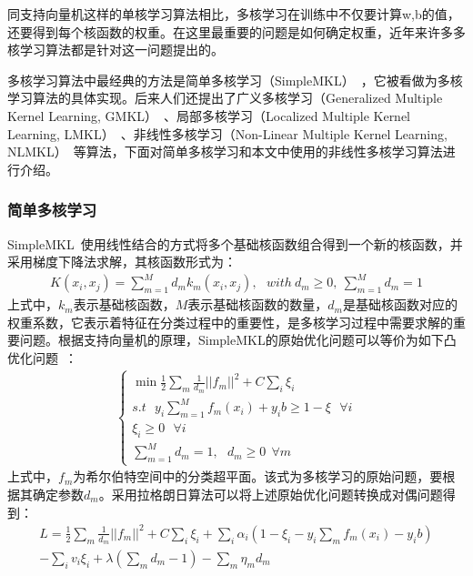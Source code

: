 同支持向量机这样的单核学习算法相比，多核学习在训练中不仅要计算w,b的值，还要得到每个核函数的权重。在这里最重要的问题是如何确定权重，近年来许多多核学习算法都是针对这一问题提出的。

多核学习算法中最经典的方法是简单多核学习（SimpleMKL）~\cite{rakotomamonjy2008simplemkl}，它被看做为多核学习算法的具体实现。后来人们还提出了广义多核学习（Generalized Multiple Kernel Learning, GMKL）~\cite{varma2009more}、局部多核学习（Localized Multiple Kernel Learning, LMKL）~\cite{gonen2008localized}、非线性多核学习（Non-Linear Multiple Kernel Learning, NLMKL）~\cite{cortes2009learning}等算法，下面对简单多核学习和本文中使用的非线性多核学习算法进行介绍。

\subsubsection{简单多核学习}
SimpleMKL~\cite{rakotomamonjy2008simplemkl}使用线性结合的方式将多个基础核函数组合得到一个新的核函数，并采用梯度下降法求解，其核函数形式为：
\begin{eqnarray}
K(x_{i},x_{j})=\sum^{M}_{m=1}d_{m}k_{m}(x_{i},x_{j}), ~~~ with ~ d_{m} \ge 0, ~\sum^{M}_{m=1}d_{m}=1
\end{eqnarray}
上式中，$k_{m}$表示基础核函数，$M$表示基础核函数的数量，$d_{m}$是基础核函数对应的权重系数，它表示着特征在分类过程中的重要性，是多核学习过程中需要求解的重要问题。根据支持向量机的原理，SimpleMKL的原始优化问题可以等价为如下凸优化问题~\cite{孙锐2014基于多特征和多核学习的行人检测方法的研究}：
\begin{eqnarray}
\left\{ \begin{array}{l} \min \frac{1}{2}\sum_{m}\frac{1}{d_{m}}||f_{m}||^{2}+C\sum_{i}\xi_{i}\\
s.t ~~~ y_{i}\sum^{M}_{m=1}f_{m}(x_{i})+y_{i}b \ge 1-\xi ~~~ \forall i\\
\xi_{i}\ge 0 ~~~ \forall i\\
\sum^{M}_{m=1}d_{m}=1, ~~~ d_{m} \ge 0 ~~ \forall m\end{array} \right.
\end{eqnarray}
上式中，$f_{m}$为希尔伯特空间中的分类超平面。该式为多核学习的原始问题，要根据其确定参数$d_{m}$。采用拉格朗日算法可以将上述原始优化问题转换成对偶问题得到：
\begin{multline}
L=\frac{1}{2}\sum_{m}\frac{1}{d_{m}}||f_{m}||^{2}+C\sum_{i}\xi_{i}+\sum_{i}\alpha_{i}(1-\xi_{i}-y_{i}\sum_{m}f_{m}(x_{i})-y_{i}b)\\
-\sum_{i}v_{i}\xi_{i}+\lambda(\sum_{m}d_{m}-1)-\sum_{m}\eta_{m}d_{m}
\end{multline}
